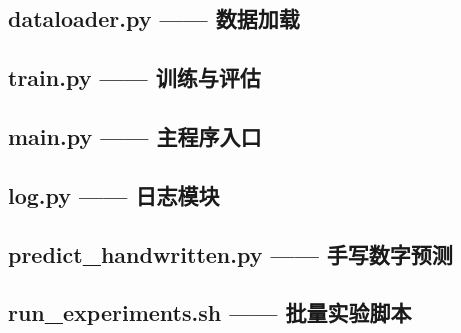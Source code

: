 \documentclass[UTF8,a4paper,12pt]{ctexart}
\begin{document}


\subsection{dataloader.py —— 数据加载}



\subsection{train.py —— 训练与评估}



\subsection{main.py —— 主程序入口}



\subsection{log.py —— 日志模块}



\subsection{predict\_handwritten.py —— 手写数字预测}



\subsection{run\_experiments.sh —— 批量实验脚本}


\end{document}
